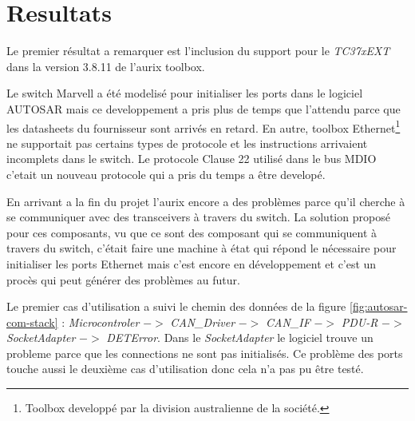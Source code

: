 \section{Resultats}

Le premier résultat a remarquer est l'inclusion du support pour le \textit{TC37xEXT} dans la version 3.8.11 de l'aurix toolbox.


Le switch Marvell a \'et\'e modelis\'e pour initialiser les ports dans le logiciel AUTOSAR mais ce developpement a pris plus de temps que l'attendu parce que les datasheets du fournisseur sont arriv\'es en retard. En autre, toolbox Ethernet\footnote{Toolbox developp\'e par la division australienne de la soci\'et\'e.} ne supportait pas certains types de protocole et les instructions arrivaient incomplets dans le switch. Le protocole Clause 22 utilis\'e dans le bus MDIO c'etait un nouveau protocole qui a pris du temps a \^etre develop\'e. 

En arrivant a la fin du projet l'aurix encore a des probl\`emes parce qu'il cherche \`a se communiquer avec des transceivers \`a travers du switch. La solution propos\'e pour ces composants, vu que ce sont des composant qui se communiquent \`a travers du switch, c'était faire une machine \`a \'etat qui répond le nécessaire pour initialiser les ports Ethernet mais c'est encore en développement et c'est un procès qui peut générer des problèmes au futur.

Le premier cas d'utilisation a suivi le chemin des donn\'ees de la figure \ref{fig:autosar-com-stack} : \textit{Microcontroler} $->$ \textit{CAN\_Driver} $->$ \textit{CAN\_IF} $->$ \textit{PDU-R} $->$ \textit{SocketAdapter}\cite{sock_adp_man} $->$ \textit{DETError}\cite{det_man}. Dans le \textit{SocketAdapter} le logiciel trouve un probleme parce que les connections ne sont pas initialis\'es. Ce probl\`eme des ports touche aussi le deuxième cas d'utilisation donc cela n'a pas pu \^etre test\'e.

